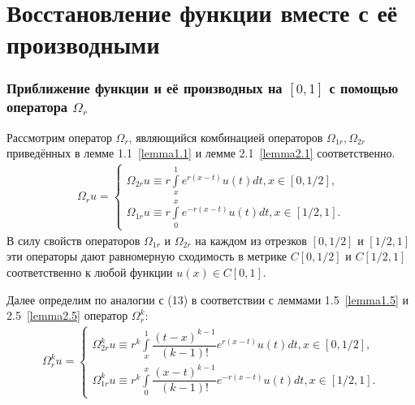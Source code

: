 \documentclass[10pt,utf8,presentation,notheorems]{beamer}
\theoremstyle{plain}
\theoremstyle{definition}
\begin{document}
\section{Восстановление функции вместе с её производными}
\begin{frame}
\frametitle{Приближение функции и её производных на $ [0,1] $ с помощью оператора $ \Omega_r $}
Рассмотрим оператор $ \Omega_r $, являющийся комбинацией операторов $ \Omega_{1r}, \Omega_{2r} $ приведённых в лемме 1.1~\eqref{lemma1.1} и лемме 2.1~\eqref{lemma2.1} соответственно.
\begin{equation}
\begin{array}{c}
\Omega_r u = \left\{
\begin{array}{l}
\Omega_{2r}u \equiv r\int\limits_x^1 e^{r(x-t)}u(t)dt, x \in [0,1/2], \\
\Omega_{1r}u \equiv r\int\limits_0^x e^{-r(x-t)}u(t)dt, x \in [1/2,1].
\end{array}
\right.
\end{array}
\end{equation}
В силу свойств операторов $ \Omega_{1r} $ и $ \Omega_{2r} $ на каждом из отрезков $ [0,1/2] $ и $ [1/2,1] $ эти операторы дают равномерную сходимость в метрике $ C[0,1/2] $ и $ C[1/2,1] $ соответственно к любой функции $ u(x) \in C[0,1] $.

Далее определим по аналогии с (13) в соответствии с леммами 1.5~\eqref{lemma1.5} и 2.5~\eqref{lemma2.5} оператор $ \Omega_r^k $:
\begin{equation}
\begin{array}{c}
\Omega_r^k u = \left\{
\begin{array}{l}
\Omega_{2r}^ku \equiv r^k\int\limits_x^1 \dfrac{(t-x)^{k-1}}{(k-1)!} e^{r(x-t)}u(t)dt, x \in [0,1/2], \\
\Omega_{1r}^ku \equiv r^k\int\limits_0^x \dfrac{(x-t)^{k-1}}{(k-1)!} e^{-r(x-t)}u(t)dt, x \in [1/2,1].
\end{array}
\right.
\end{array}
\end{equation}
\end{frame}
\end{document}
